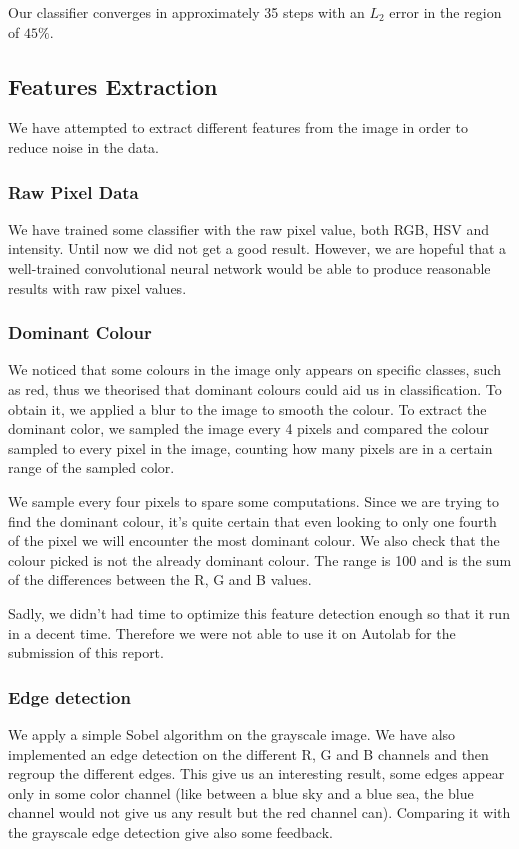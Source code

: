 \documentclass{article} %
\begin{document}
Our classifier converges in approximately 35 steps with an $L_2$ error in the region of $45\%$.

\subsection{Features Extraction}
We have attempted to extract different features from the image in order to reduce noise in the data.

\subsubsection{Raw Pixel Data}
We have trained some classifier with the raw pixel value, both RGB, HSV and intensity. Until now we did not get a good result. However, we are hopeful that a well-trained convolutional neural network would be able to produce reasonable results with raw pixel values.

\subsubsection{Dominant Colour}
We noticed that some colours in the image only appears on specific classes, such as red, thus we theorised that dominant colours could aid us in classification. To obtain it, we applied a blur to the image to smooth the colour. To extract the dominant color, we sampled the image every 4 pixels and compared the colour sampled to every pixel in the image, counting how many pixels are in a certain range of the sampled color.

We sample every four pixels to spare some computations. Since we are trying to find the dominant colour, it's quite certain that even looking to only one fourth of the pixel we will encounter the most dominant colour. We also check that the colour picked is not the already dominant colour. The range is 100 and is the sum of the differences between the R, G and B values. 

Sadly, we didn't had time to optimize this feature detection enough so that it run in a decent time. Therefore we were not able to use it on Autolab for the submission of this report.

\subsubsection{Edge detection}
We apply a simple Sobel algorithm on the grayscale image. We have also implemented an edge detection on the different R, G and B channels and then regroup the different edges. This give us an interesting result, some edges appear only in some color channel (like between a blue sky and a blue sea, the blue channel would not give us any result but the red channel can). Comparing it with the grayscale edge detection give also some feedback.
\end{document}
